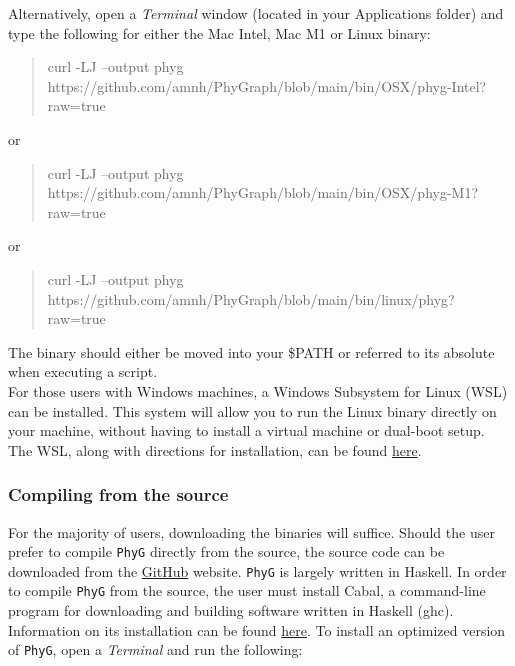 \documentclass[11pt]{book}
\newcommand{\phyg}{\texttt{PhyG} }
\begin{document}
{{		Alternatively, open a \textit{Terminal} window (located in your Applications folder) and type 
		the following for either the Mac Intel, Mac M1 or Linux binary:
		
		\begin {quote}
		curl -LJ --output phyg https://github.com/amnh/PhyGraph/blob/main/bin/OSX/phyg-Intel?raw=true
		\end{quote}		
		
		\noindent or 
		
		\begin {quote}
		curl -LJ --output phyg https://github.com/amnh/PhyGraph/blob/main/bin/OSX/phyg-M1?raw=true
		\end{quote}	
		
		\noindent or 
		
		\begin {quote}
		curl -LJ --output phyg https://github.com/amnh/PhyGraph/blob/main/bin/linux/phyg?
		raw=true
		\end{quote}
		
		\noindent The binary should either be moved into your \$PATH or referred to its 
		absolute when executing a script.\\
		
		For those users with Windows machines, a Windows Subsystem for Linux 
		(WSL) can be installed. This system will allow you to run the Linux binary directly 
		on your machine, without having to install a virtual machine or dual-boot setup. 
		The WSL, along with directions for installation, can be found 
		\href{https://learn.microsoft.com/en-us/windows/wsl/}{here}.
	
		\subsubsection{Compiling from the source}
		For the majority of users, downloading the binaries will suffice. Should the user prefer to 
		compile \phyg directly from the source, the source code can be downloaded 
		from the \href{https://github.com/amnh/PhyGraph}{GitHub} website. \phyg is largely 
		written in Haskell. In order to compile \phyg from the source, the user must install Cabal, 
		a command-line program for downloading and building software written in Haskell (ghc).  
		Information on its installation can be found  
		\href{https://www.schoolofhaskell.com/user/simonmichael/how-to-cabal-install}{here}.
		To install an optimized version of \texttt{PhyG}, open a \textit{Terminal} and run the 
		following:
		
}}
\end{document}
